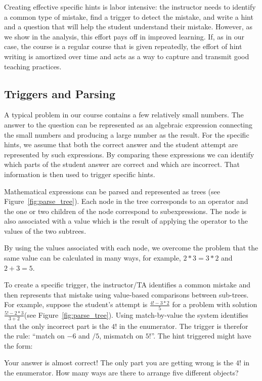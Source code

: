 \documentclass{llncs2e/llncs}
\begin{document}
Creating effective specific hints is labor intensive: the instructor needs to identify a common type of mistake, find a trigger to detect the mistake, and write a hint and a question that will help the student understand their mistake. However, as we show in the analysis, this effort pays off in improved learning. If, as in our case, the course is a regular course that is given repeatedly, the effort of hint writing is amortized over time and acts as a way to capture and transmit good teaching practices.


\subsection*{Triggers and Parsing}

A typical problem in our course contains a few relatively small numbers. The answer to the question can be represented as an algebraic expression connecting the small numbers and producing a large number as the result. For the specific hints, we assume that both the correct answer and the student attempt are represented by such expressions. By comparing these expressions we can identify which parts of the student answer are correct and which are incorrect. That information is then used to trigger specific hints.

Mathematical expressions can be parsed and represented as trees (see Figure~\ref{fig:parse_tree}). Each node in the tree corresponds to an operator and the one or two children of the node correspond to subexpressions. The node is also associated with a value which is the result of applying the operator to the values of the two subtrees.

By using the values associated with each node, we overcome the problem that the same value can be calculated in many ways, for example, $2*3 = 3*2$ and $2+3=5$. 

To create a specific trigger, the instructor/TA identifies a common mistake and then represents that mistake using value-based comparisons between sub-trees. For example, suppose the student's attempt is $\frac{4!-3*2}{5}$ for a problem with solution $\frac{5!-2*3}{3+2}$(see Figure~\ref{fig:parse_tree}). Using match-by-value the system identifies that the only incorrect part is the $4!$ in the enumerator. The trigger is therefor the rule: ``match on $-6$ and $/5$, mismatch on $5!$''. The hint triggered might have the form:
\begin{displayquote}
Your answer is almost correct! The only part you are getting wrong is
the $4!$ in the enumerator. How many ways are there to arrange five different objects?
\end{displayquote}
\end{document}
